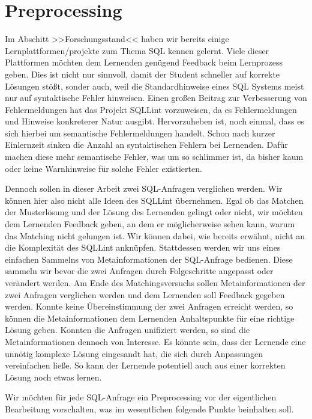 \section{Preprocessing}

Im Abschitt >>Forschungsstand<< haben wir bereits einige Lernplattformen/projekte zum Thema SQL kennen gelernt. Viele dieser Plattformen möchten dem Lernenden genügend Feedback beim Lernprozess geben. Dies ist nicht nur sinnvoll, damit der Student schneller auf korrekte Lösungen stößt, sonder auch, weil die Standardhinweise eines SQL Systems meist nur auf syntaktische Fehler hinweisen. Einen großen Beitrag zur Verbesserung von Fehlermeldungen hat das Projekt SQLLint vorzuweisen, da es Fehlermeldungen und Hinweise konkreterer Natur ausgibt. Hervorzuheben ist, noch einmal, dass es sich hierbei um semantische Fehlermeldungen handelt. Schon nach kurzer Einlernzeit sinken die Anzahl an syntaktischen Fehlern bei Lernenden. Dafür machen diese mehr semantische Fehler, was um so schlimmer ist, da bisher kaum oder keine Warnhinweise für solche Fehler existierten. 

Dennoch sollen in dieser Arbeit zwei SQL-Anfragen verglichen werden. Wir können hier also nicht alle Ideen des SQLLint übernehmen. Egal ob das Matchen der Musterlösung und der Lösung des Lernenden gelingt oder nicht, wir möchten dem Lernenden Feedback geben, an dem er möglicherweise sehen kann, warum das Matching nicht gelungen ist. Wir können dabei, wie bereits erwähnt, nicht an die Komplexität des SQLLint anknüpfen. Stattdessen werden wir uns eines einfachen Sammelns von Metainformationen der SQL-Anfrage bedienen. Diese sammeln wir bevor die zwei Anfragen durch Folgeschritte angepasst oder verändert werden. Am Ende des Matchingsversuchs sollen Metainformationen der zwei Anfragen verglichen werden und dem Lernenden soll Feedback gegeben werden. Konnte keine Übereinstimmung der zwei Anfragen erreicht werden, so können die Metainformationen dem Lernenden Anhaltspunkte für eine richtige Lösung geben. Konnten die Anfragen unifiziert werden, so sind die Metainformationen dennoch von Interesse. Es könnte sein, dass der Lernende eine unnötig komplexe Lösung eingesandt hat, die sich durch Anpassungen vereinfachen ließe. So kann der Lernende potentiell auch aus einer korrekten Lösung noch etwas lernen.

Wir möchten für jede SQL-Anfrage ein Preprocessing vor der eigentlichen Bearbeitung vorschalten, was im wesentlichen folgende Punkte beinhalten soll.

